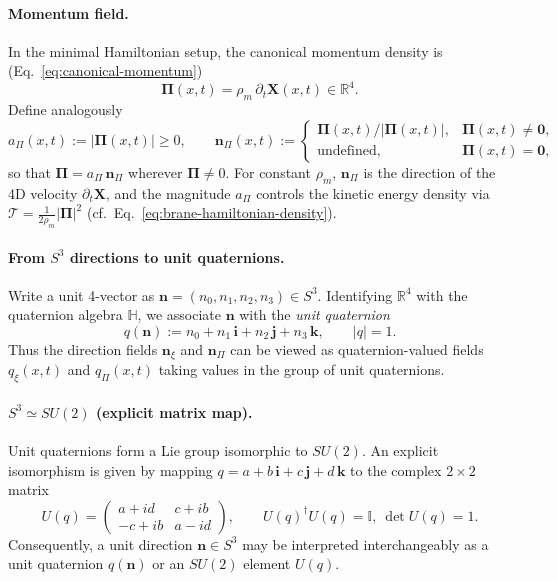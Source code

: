 \paragraph{Momentum field.}
In the minimal Hamiltonian setup, the canonical momentum density is
(Eq.~\eqref{eq:canonical-momentum})
\[
\boldsymbol\Pi(x,t)=\rho_m\,\partial_t \mathbf X(x,t)\in\mathbb R^4.
\]
Define analogously
\begin{equation}
  a_\Pi(x,t) := |\boldsymbol\Pi(x,t)| \ge 0,
  \qquad
  \mathbf n_\Pi(x,t) :=
  \begin{cases}
    \boldsymbol\Pi(x,t)/|\boldsymbol\Pi(x,t)|, & \boldsymbol\Pi(x,t)\neq \mathbf 0,\\
    \text{undefined}, & \boldsymbol\Pi(x,t)=\mathbf 0,
  \end{cases}
  \label{eq:pi-amplitude-direction}
\end{equation}
so that $\boldsymbol\Pi=a_\Pi\,\mathbf n_\Pi$ wherever $\boldsymbol\Pi\neq 0$.
For constant $\rho_m$, $\mathbf n_\Pi$ is the direction of the 4D velocity
$\partial_t\mathbf X$, and the magnitude $a_\Pi$ controls the kinetic energy
density via $\mathcal T=\frac{1}{2\rho_m}|\boldsymbol\Pi|^2$
(cf.\ Eq.~\eqref{eq:brane-hamiltonian-density}).

\paragraph{From $S^3$ directions to unit quaternions.}
Write a unit 4-vector as $\mathbf n=(n_0,n_1,n_2,n_3)\in S^3$.
Identifying $\mathbb R^4$ with the quaternion algebra $\mathbb H$,
we associate $\mathbf n$ with the \emph{unit quaternion}
\begin{equation}
  q(\mathbf n) := n_0 + n_1\,\mathbf i + n_2\,\mathbf j + n_3\,\mathbf k,
  \qquad |q|=1.
  \label{eq:unit-quaternion}
\end{equation}
Thus the direction fields $\mathbf n_\xi$ and $\mathbf n_\Pi$ can be viewed as
quaternion-valued fields $q_\xi(x,t)$ and $q_\Pi(x,t)$ taking values in the group
of unit quaternions.

\paragraph{$S^3\simeq SU(2)$ (explicit matrix map).}
Unit quaternions form a Lie group isomorphic to $SU(2)$.
An explicit isomorphism is given by mapping $q=a+b\,\mathbf i+c\,\mathbf j+d\,\mathbf k$
to the complex $2\times 2$ matrix
\begin{equation}
  U(q)=
  \begin{pmatrix}
    a+i d & c+i b\\
    -c+i b & a-i d
  \end{pmatrix},
  \qquad
  U(q)^\dagger U(q)=\mathbb I,\ \det U(q)=1.
  \label{eq:quaternion-to-su2}
\end{equation}
Consequently, a unit direction $\mathbf n\in S^3$ may be interpreted
interchangeably as a unit quaternion $q(\mathbf n)$ or an $SU(2)$ element $U(q)$.

